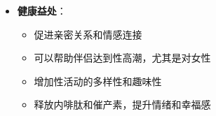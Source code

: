 \documentclass[12pt,UTF8]{ctexbook}
\begin{document}
\begin{itemize}
\begin{itemize}
\begin{itemize}
      \item 与新伴侣进行坦诚的性健康沟通
      \item 避免吞咽精液或阴道分泌物，减少感染风险
      \end{itemize}
    \end{itemize}
  \item \textbf{健康益处}：
    \begin{itemize}
    \item 促进亲密关系和情感连接
    \item 可以帮助伴侣达到性高潮，尤其是对女性
    \item 增加性活动的多样性和趣味性
    \item 释放内啡肽和催产素，提升情绪和幸福感
    \end{itemize}
  \end{itemize}
\end{document}

